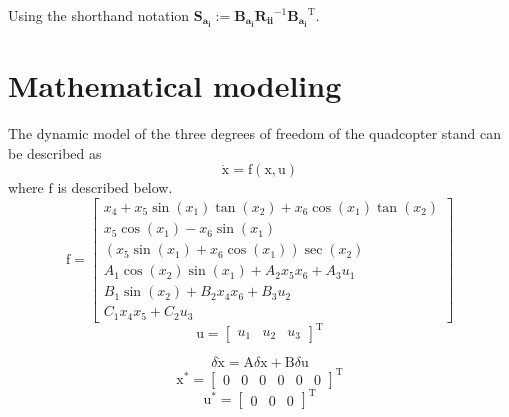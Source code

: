 \documentclass[conference]{IEEEtran}
\begin{document}
Using the shorthand notation $\boldsymbol{S_{a_i}} := \boldsymbol{B_{a_i}R_{ii}}^{-1}\boldsymbol{B_{a_i}}^\mathrm{T}$. %








\section{Mathematical modeling}
The dynamic model of the three degrees of freedom of the quadcopter stand  can be described as
\begin{equation}
	\boldsymbol{\dot{\mathrm{x}}} = \boldsymbol{\mathrm{f}}(\boldsymbol{\mathrm{x}}, \boldsymbol{\mathrm{u}})
\end{equation}
where $\boldsymbol{\mathrm{f}}$ is described below.
\begin{equation}
	\boldsymbol{\mathrm{f}} = \begin{bmatrix}
		x_4 + x_5\sin(x_1)\tan(x_2) + x_6\cos(x_1)\tan(x_2)\\
		x_5\cos(x_1)- x_6\sin(x_1)\\
		(x_5\sin(x_1) + x_6\cos(x_1))\sec(x_2)\\
		A_1\cos(x_2)\sin(x_1) + 
		A_2x_5x_6 + A_3u_1
		\\
		B_1\sin(x_2) + 
		B_2x_4x_6 + B_3u_2\\
		C_1x_4x_5 + 
		C_2u_3
	\end{bmatrix}
\end{equation} 
\begin{equation}
	\boldsymbol{\mathrm{u}} = \begin{bmatrix}
		u_1&u_2&u_3
	\end{bmatrix}^\mathrm{T}
\end{equation}

\begin{equation}
	\delta \dot{\boldsymbol{\mathrm{x}}} = \boldsymbol{\mathrm{A}}\delta \boldsymbol{\mathrm{x}} + \boldsymbol{\mathrm{B}}\delta \boldsymbol{\mathrm{u}}
\end{equation}
\begin{equation}
	\boldsymbol{\mathrm{x}^*} = \begin{bmatrix} %
		0& 0 & 0 & 0& 0& 0
	\end{bmatrix}^\mathrm{T}
\end{equation}
\begin{equation}
	\boldsymbol{\mathrm{u}^*} = \begin{bmatrix}
		0&0&0
	\end{bmatrix}^\mathrm{T}
\end{equation}
\end{document}
